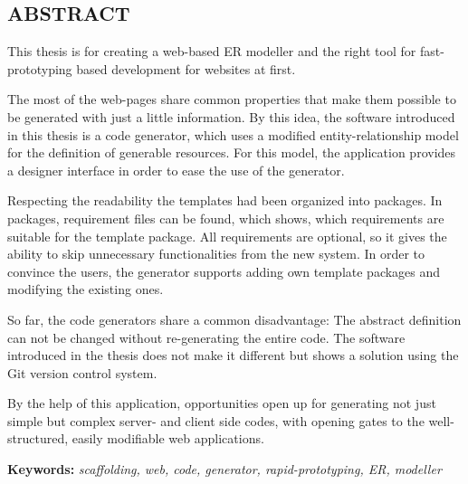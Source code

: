 \begin{center}
\section*{\textbf{\Large \MakeUppercase{\textrm{Abstract}}}}
\end{center}



\begin{justify}
This thesis is for creating a web-based ER modeller and the right tool for fast-prototyping based development for websites at first.

The most of the web-pages share common properties that make them possible to be generated with just a little information. By this idea, the software introduced in this thesis is a code generator, which uses a modified entity-relationship model for the definition of generable resources. For this model, the application provides a designer interface in order to ease the use of the generator.

Respecting the readability the templates had been organized into packages. In packages, requirement files can be found, which shows, which requirements are suitable for the template package. All requirements are optional, so it gives the ability to skip unnecessary functionalities from the new system. In order to convince the users, the generator supports adding own template packages and modifying the existing ones.

So far, the code generators share a common disadvantage: The abstract definition can not be changed without re-generating the entire code. The software introduced in the thesis does not make it different but shows a solution using the Git version control system. 

By the help of this application, opportunities open up for generating not just simple but complex server- and client side codes, with opening gates to the well-structured, easily modifiable web applications. 
\end{justify}



\vspace{2cm}

{\bf Keywords:} {\it  scaffolding, web, code, generator, rapid-prototyping, ER, modeller}